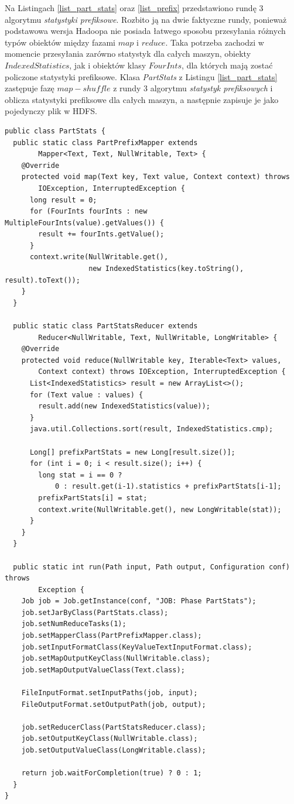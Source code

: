 \documentclass[magisterska]{pracamgr}
\begin{document}
Na Listingach \ref{list_part_stats} oraz \ref{list_prefix} przedstawiono rundę 3 algorytmu \textit{statystyki prefiksowe}. Rozbito ją na dwie faktyczne rundy, ponieważ podstawowa wersja Hadoopa nie posiada łatwego sposobu przesyłania różnych typów obiektów między fazami \(map\) i \(reduce\). Taka potrzeba zachodzi w momencie przesyłania zarówno statystyk dla całych maszyn, obiekty \(IndexedStatistics\), jak i obiektów klasy \(FourInts\), dla których mają zostać policzone statystyki prefiksowe. Klasa \textit{PartStats} z Listingu \ref{list_part_stats} zastępuje fazę \(map - shuffle\) z rundy 3 algorytmu \textit{statystyk prefiksowych} i oblicza statystyki prefiksowe dla całych maszyn, a następnie zapisuje je jako pojedynczy plik w HDFS.

\begin{lstlisting}[language=SmallJava,firstnumber=1,label=list_part_stats,caption=Faza liczenia statystyk prefiksowych dla całych maszyn]
public class PartStats {
  public static class PartPrefixMapper extends
        Mapper<Text, Text, NullWritable, Text> {
    @Override
    protected void map(Text key, Text value, Context context) throws
        IOException, InterruptedException {
      long result = 0;
      for (FourInts fourInts : new MultipleFourInts(value).getValues()) {
        result += fourInts.getValue();
      }
      context.write(NullWritable.get(),
                    new IndexedStatistics(key.toString(), result).toText());
    }
  }

  public static class PartStatsReducer extends
        Reducer<NullWritable, Text, NullWritable, LongWritable> {
    @Override
    protected void reduce(NullWritable key, Iterable<Text> values,
        Context context) throws IOException, InterruptedException {
      List<IndexedStatistics> result = new ArrayList<>();
      for (Text value : values) {
        result.add(new IndexedStatistics(value));
      }
      java.util.Collections.sort(result, IndexedStatistics.cmp);

      Long[] prefixPartStats = new Long[result.size()];
      for (int i = 0; i < result.size(); i++) {
        long stat = i == 0 ?
            0 : result.get(i-1).statistics + prefixPartStats[i-1];
        prefixPartStats[i] = stat;
        context.write(NullWritable.get(), new LongWritable(stat));
      }
    }
  }

  public static int run(Path input, Path output, Configuration conf) throws 
        Exception {
    Job job = Job.getInstance(conf, "JOB: Phase PartStats");
    job.setJarByClass(PartStats.class);
    job.setNumReduceTasks(1);
    job.setMapperClass(PartPrefixMapper.class);
    job.setInputFormatClass(KeyValueTextInputFormat.class);
    job.setMapOutputKeyClass(NullWritable.class);
    job.setMapOutputValueClass(Text.class);

    FileInputFormat.setInputPaths(job, input);
    FileOutputFormat.setOutputPath(job, output);

    job.setReducerClass(PartStatsReducer.class);
    job.setOutputKeyClass(NullWritable.class);
    job.setOutputValueClass(LongWritable.class);

    return job.waitForCompletion(true) ? 0 : 1;
  }
}
\end{lstlisting}
\end{document}
